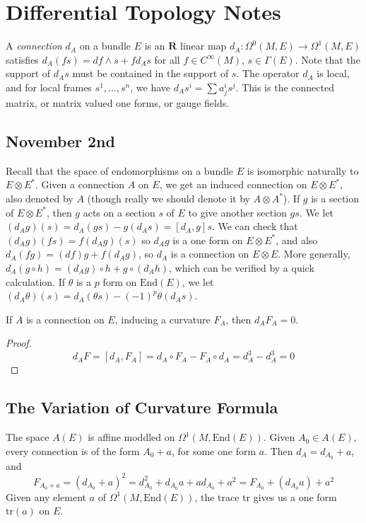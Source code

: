 \chapter{Differential Topology Notes}

A \emph{connection} $d_A$ on a bundle $E$ is an $\mathbf{R}$ linear map $d_A: \Omega^0(M,E) \to \Omega^1(M,E)$ satisfies $d_A(fs) = df \wedge s + f d_A s$ for all $f \in C^\infty(M)$, $s \in \Gamma(E)$. Note that the support of $d_A s$ must be contained in the support of $s$. The operator $d_A$ is local, and for local frames $s^1, \dots, s^n$, we have $d_A s^i = \sum a_j^i s^j$. This is the connected matrix, or matrix valued one forms, or gauge fields.


\section{November 2nd}

Recall that the space of endomorphisms on a bundle $E$ is isomorphic naturally to $E \otimes E^*$. Given a connection $A$ on $E$, we get an induced connection on $E \otimes E^*$, also denoted by $A$ (though really we should denote it by $A \otimes A^*$). If $g$ is a section of $E \otimes E^*$, then $g$ acts on a section $s$ of $E$ to give another section $gs$. We let $(d_A g)(s) = d_A(gs) - g(d_A s) = [d_A, g] s$. We can check that $(d_A g)(fs) = f(d_A g)(s)$ so $d_A g$ is a one form on $E \otimes E^*$, and also $d_A(fg) = (df) g + f (d_A g)$, so $d_A$ is a connection on $E \otimes E$. More generally, $d_A(g \circ h) = (d_A g) \circ h + g \circ (d_A h)$, which can be verified by a quick calculation. If $\theta$ is a $p$ form on $\text{End}(E)$, we let $(d_A \theta)(s) = d_A(\theta s) - (-1)^p \theta(d_A s)$.

\begin{theorem}
    If $A$ is a connection on $E$, inducing a curvature $F_A$, then $d_A F_A = 0$.
\end{theorem}
\begin{proof}
    \[ d_A F = [d_A,F_A] = d_A \circ F_A - F_A \circ d_A = d_A^3 - d_A^3 = 0 \]
\end{proof}

\section{The Variation of Curvature Formula}

The space $A(E)$ is affine moddled on $\Omega^1(M, \text{End}(E))$. Given $A_0 \in A(E)$, every connection is of the form $A_0 + a$, for some one form $a$. Then $d_A = d_{A_0} + a$, and
%
\[ F_{A_0 + a} = (d_{A_0} + a)^2 = d_{A_0}^2 + d_{A_0} a + a d_{A_0} + a^2 = F_{A_0} + (d_{A_0} a) + a^2 \]
%
Given any element $a$ of $\Omega^1(M, \text{End}(E))$, the trace $\text{tr}$ gives us a one form $\text{tr}(a)$ on $E$.

